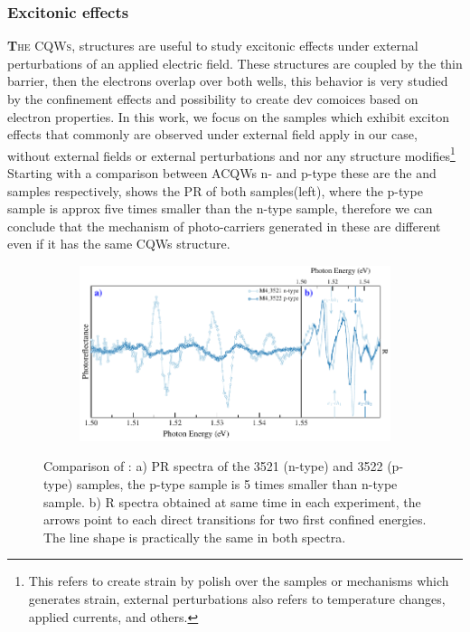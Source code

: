 \newpage
\subsubsection{Excitonic effects}
\label{subsubsec:chapter-3-PR-exciton-effects}
\vspace{-10mm} 
\lettrine[lines=3, lraise=.1, nindent=0mm, slope=0mm]{\textbf{T}}{he CQWs}, structures are useful to study excitonic effects under external perturbations of an applied electric field. These structures are coupled by the thin barrier, then the electrons overlap over both wells,  this behavior is very studied by the confinement effects and possibility to create dev comoices based on electron properties.  In this work, we focus on the samples which exhibit exciton effects that commonly are observed under external field apply in our case, without external fields or external perturbations and nor any structure modifies\footnote{This refers to create strain by polish over the samples or mechanisms which generates strain, external perturbations also refers to temperature changes, applied currents, and others.} Starting with a comparison between ACQWs n- and p-type these are the  and  samples respectively,  shows the PR of both samples(left), where the p-type sample is approx five times smaller than the n-type sample, therefore we can conclude that the mechanism of photo-carriers generated in these are different even if it has the same CQWs structure.   

\begin{figure}[ht!]
	\centering
\begin{subfigure}{\textwidth}
	\includegraphics[width=\textwidth]{../figures/chapter-3/pr-plots/build/pr-set3.pdf}
	\label{fig:chapter-3-PR-PLOT-SET3-a)}
	\label{fig:chapter-3-PR-PLOT-SET3-b)}
\end{subfigure}
	\caption{Comparison of : a) PR spectra of the 3521 (n-type) and 3522 (p-type) samples, the p-type sample is 5 times smaller than n-type sample. b) R spectra obtained at same time in each experiment, the arrows point to each direct transitions for two first confined energies. The line shape is practically the same in both spectra.} 
	\label{fig:chapter-3-PR-PLOT-SET3}
\end{figure}



